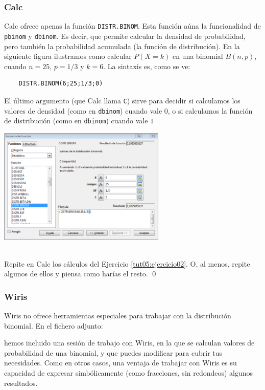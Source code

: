 \documentclass[10pt,a4paper]{article}\usepackage[]{graphicx}\usepackage[]{color}
\begin{document}
\subsubsection*{Calc}

Calc ofrece apenas la función {\tt DISTR.BINOM}. Esta función aúna la funcionalidad de {\tt pbinom} y {\tt dbinom}. Es decir, que permite calcular la densidad de probabilidad, pero también la probabilidad acumulada (la función de distribución). En la siguiente figura ilustramos como calcular $P(X=k)$ en una binomial $B(n,p)$, cuando $n=25$, $p=1/3$ y $k=6$. La sintaxis es, como se ve:
    \begin{center}
    \begin{minipage}{10cm}
    \begin{verbatim}
    DISTR.BINOM(6;25;1/3;0)
    \end{verbatim}
    \end{minipage}
    \end{center}
El último argumento (que Calc llama {\tt C}) sirve para decidir si calculamos los valores de densidad (como en {\tt dbinom}) cuando vale $0$, o si calculamos la función de distribución (como en {\tt dbinom}) cuando vale $1$
\begin{center}
    \includegraphics[width=8cm]{../fig/Tut05-19.png}
\end{center}

\begin{ejercicio}
\label{tut05:ejercicio08}
\quad\\
Repite en Calc los cálculos del Ejercicio \ref{tut05:ejercicio02}. O, al menos, repite algunos de ellos y piensa como harías el resto.
\qed
\end{ejercicio}

\subsubsection*{Wiris}

Wiris no ofrece herramientas especiales para trabajar con la distribución binomial. En el fichero adjunto:
\begin{center}
\end{center}
hemos incluido una sesión de trabajo con Wiris, en la que se calculan valores de probabilidad de una binomial, y que puedes modificar para cubrir tus necesidades. Como en otros casos, una ventaja de trabajar con Wiris es su capacidad de expresar simbólicamente (como fracciones, sin redondeos) algunos resultados.
\end{document}

